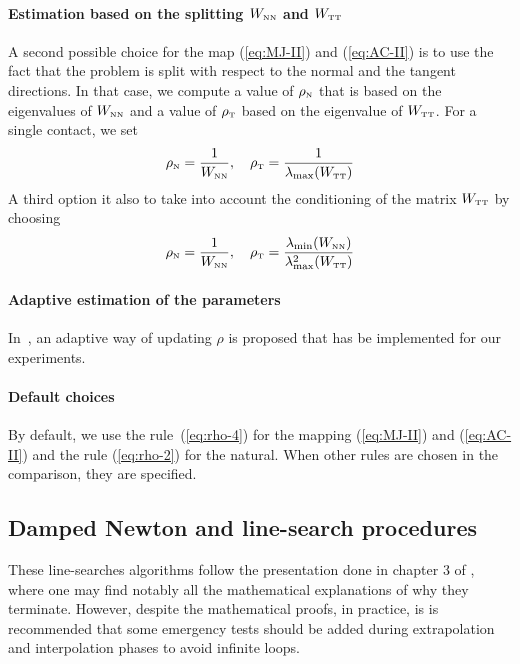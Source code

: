 \paragraph{Estimation based on the splitting  $W_{{\hbox{\tiny{N}}}{\hbox{\tiny{N}}}}$ and $W_{{\hbox{\tiny{T}}}{\hbox{\tiny{T}}}}$} A second possible choice for the map  (\ref{eq:MJ-II}) and (\ref{eq:AC-II}) is to use the fact that the problem is split with respect to the normal and the tangent directions. In that case, we compute a value of $\rho_{\hbox{\tiny{N}}}$ that is based on the eigenvalues of $W_{{\hbox{\tiny{N}}}{\hbox{\tiny{N}}}}$ and a value of $\rho_{\hbox{\tiny{T}}}$ based on the eigenvalue of $W_{{\hbox{\tiny{T}}}{\hbox{\tiny{T}}}}$. For a single contact, we set
\begin{equation}
  \label{eq:rho-3}
  \rho_\n = \frac 1 {W_{\n\n}}, \quad \rho_\t = \frac{1}{\lambda_{\max}(W_{\t\t})}
\end{equation}
A third option it also to take into account the conditioning of the matrix $W_{{\hbox{\tiny{T}}}{\hbox{\tiny{T}}}}$ by choosing
\begin{equation}
  \label{eq:rho-4}
  \rho_\n = \frac 1 {W_{\n\n}}, \quad \rho_\t = \frac{\lambda_{\min}(W_{\n\n})}{\lambda^2_{\max}(W_{\t\t})}
\end{equation}

\paragraph{Adaptive estimation of the parameters} In~\cite{Koziara.Bicanic_CMAME2008}, an adaptive way of updating $\rho$ is proposed that has be implemented for our experiments.

\paragraph{Default choices} By default, we use the rule~(\ref{eq:rho-4}) for the mapping  (\ref{eq:MJ-II}) and (\ref{eq:AC-II}) and the rule  (\ref{eq:rho-2}) for the natural. When other rules are chosen in the comparison, they are specified.


\subsection{Damped Newton and line-search procedures}
These line-searches algorithms follow the presentation done in chapter 3 of
\cite{Bonnans.ea2003}, where one may find notably all the mathematical
explanations of why they terminate. However, despite the mathematical proofs,
in practice, is is recommended that some emergency tests should be added
during extrapolation and interpolation phases to avoid infinite loops.


